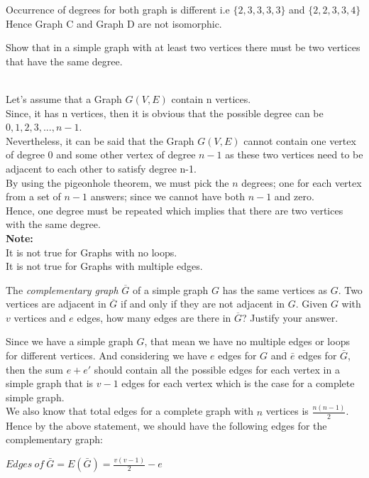 \documentclass[addpoints]{exam}
\begin{document}
\begin{questions}
\begin{parts}
\begin{solution}
      Occurrence of degrees for both graph is different i.e $\{2,3,3,3,3\}$ and $\{2,2,3,3,4\}$\\
      Hence Graph C and Graph D are not isomorphic.
      \end{solution}
  \end{parts}

\question[5] Show that in a simple graph with at least two vertices there must be two vertices that have the same degree.
  \begin{solution}\\
    Let's assume that a Graph $G(V,E)$ contain n vertices.\\
    Since, it has n vertices, then it is obvious that the possible degree can be $0,1,2,3, ... , n-1$.\\
    Nevertheless, it can be said that the Graph $G(V,E)$ cannot contain one vertex of degree $0$ and some other vertex of degree $n-1$ as these two vertices need to be adjacent to each other to satisfy degree n-1.\\
    By using the pigeonhole theorem, we must pick the $n$ degrees; one for each vertex from a set of $n-1$ answers; since we cannot have both $n-1$ and zero.\\
    Hence, one degree must be repeated which implies that there are two vertices with the same degree.\\
    \textbf{Note:}\\
    It is not true for Graphs with no loops.\\
    It is not true for Graphs with multiple edges.\\
  \end{solution}
  
\question[5] The \textit{complementary graph} $\overline{G}$ of a simple graph $G$ has the same vertices as  $G$. Two vertices are adjacent in $\overline{G}$ if and only if they are not adjacent in $G$. Given $G$ with $v$ vertices and $e$ edges, how many edges are there in $\overline{G}$? Justify your answer.
  \begin{solution}
    Since we have a simple graph $G$, that mean we have no multiple edges or loops for different vertices. And considering we have $e$ edges for $G$ and $\bar{e}$ edges for $\bar{G}$, then the sum $e+e'$ should contain all the possible edges for each vertex in a simple graph that is $v-1$ edges for each vertex which is the case for a complete simple graph.\\
	We also know that total edges for a complete graph with $n$ vertices is $\frac{n(n-1)}{2}$.\\
	Hence by the above statement, we should have the following edges for the complementary graph:
	\begin{center}
	$Edges\  of\  \bar{G}=E(\bar{G})=\frac{v(v-1)}{2} - e$
	\end{center}
  \end{solution}
  

\end{questions}
\end{document}
